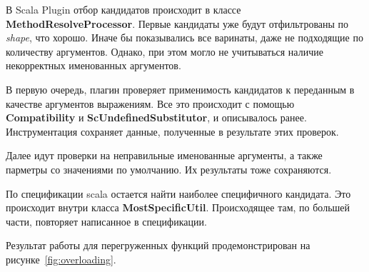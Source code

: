 В Scala Plugin отбор кандидатов происходит в классе
\textbf{MethodResolveProcessor}.
Первые кандидаты уже будут отфильтрованы по \textit{shape}, что хорошо.
Иначе бы показывались все варинаты, даже не подходящие по количеству аргументов.
Однако, при этом могло не учитываться наличие некорректных именованных аргументов.

В первую очередь, плагин проверяет применимость кандидатов к переданным в
качестве аргументов выражениям.
Все это происходит с помощью \textbf{Compatibility} и
\textbf{ScUndefinedSubstitutor}, и описывалось ранее.
Инструментация сохраняет данные, полученные в результате этих проверок.

Далее идут проверки на неправильные именованные аргументы,
а также парметры со значениями по умолчанию.
Их результаты тоже сохраняются.

По спецификации scala остается найти наиболее специфичного кандидата.
Это происходит внутри класса \textbf{MostSpecificUtil}.
Происходящее там, по большей части, повторяет написанное в спецификации.

Результат работы для перегруженных функций продемонстрирован на
рисунке~\ref{fig:overloading}.
